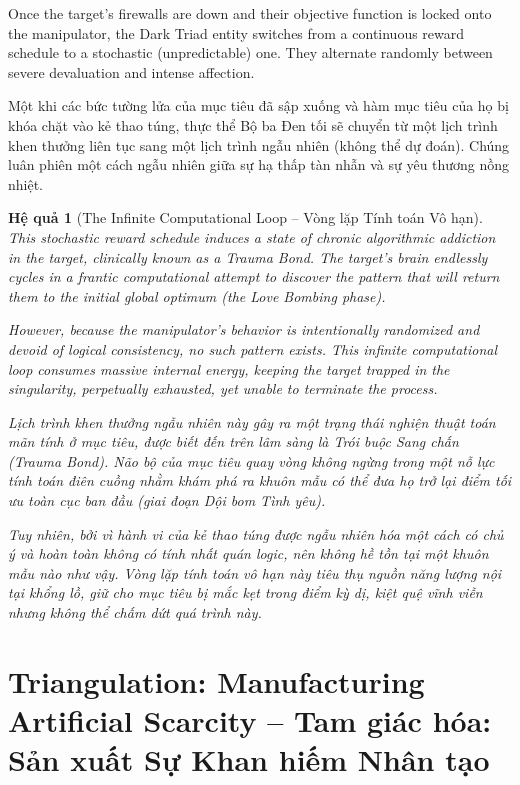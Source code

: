 \documentclass{report}
\newtheorem{hequa}{Hệ quả}
\begin{document}
Once the target's firewalls are down and their objective function is locked onto the manipulator, the Dark Triad entity switches from a continuous reward schedule to a stochastic (unpredictable) one. They alternate randomly between severe devaluation and intense affection.

Một khi các bức tường lửa của mục tiêu đã sập xuống và hàm mục tiêu của họ bị khóa chặt vào kẻ thao túng, thực thể Bộ ba Đen tối sẽ chuyển từ một lịch trình khen thưởng liên tục sang một lịch trình ngẫu nhiên (không thể dự đoán). Chúng luân phiên một cách ngẫu nhiên giữa sự hạ thấp tàn nhẫn và sự yêu thương nồng nhiệt.

\begin{hequa}[The Infinite Computational Loop -- Vòng lặp Tính toán Vô hạn]
	This stochastic reward schedule induces a state of chronic algorithmic addiction in the target, clinically known as a Trauma Bond. The target's brain endlessly cycles in a frantic computational attempt to discover the pattern that will return them to the initial global optimum (the Love Bombing phase). 
	
	However, because the manipulator's behavior is intentionally randomized and devoid of logical consistency, no such pattern exists. This infinite computational loop consumes massive internal energy, keeping the target trapped in the singularity, perpetually exhausted, yet unable to terminate the process.
	
	Lịch trình khen thưởng ngẫu nhiên này gây ra một trạng thái nghiện thuật toán mãn tính ở mục tiêu, được biết đến trên lâm sàng là Trói buộc Sang chấn (Trauma Bond). Não bộ của mục tiêu quay vòng không ngừng trong một nỗ lực tính toán điên cuồng nhằm khám phá ra khuôn mẫu có thể đưa họ trở lại điểm tối ưu toàn cục ban đầu (giai đoạn Dội bom Tình yêu).
	
	Tuy nhiên, bởi vì hành vi của kẻ thao túng được ngẫu nhiên hóa một cách có chủ ý và hoàn toàn không có tính nhất quán logic, nên không hề tồn tại một khuôn mẫu nào như vậy. Vòng lặp tính toán vô hạn này tiêu thụ nguồn năng lượng nội tại khổng lồ, giữ cho mục tiêu bị mắc kẹt trong điểm kỳ dị, kiệt quệ vĩnh viễn nhưng không thể chấm dứt quá trình này.
\end{hequa}

\section{Triangulation: Manufacturing Artificial Scarcity -- Tam giác hóa: Sản xuất Sự Khan hiếm Nhân tạo}
\end{document}
